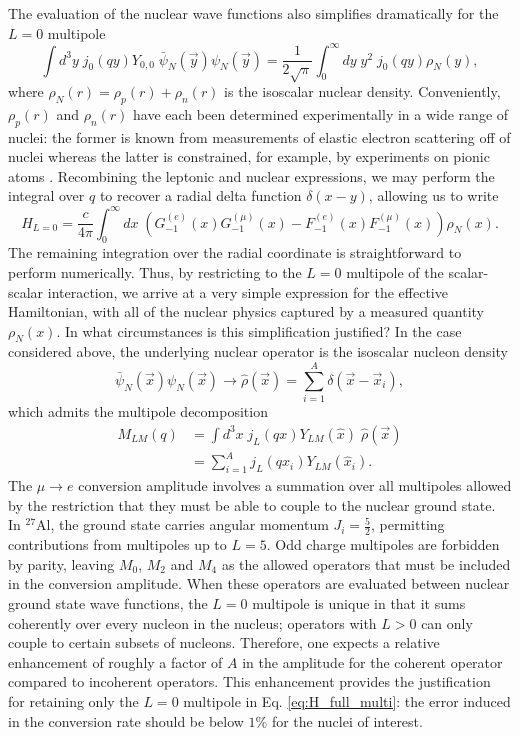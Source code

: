 \documentclass{book}[letterpaper,12pt]
\begin{document}
The evaluation of the nuclear wave functions also simplifies dramatically for the $L=0$ multipole
\begin{equation}
\int d^3y\;j_0(qy)Y_{0,0}\;\bar{\psi}_N(\vec{y})\psi_N(\vec{y})=\frac{1}{2\sqrt{\pi}}\int_0^{\infty}dy\;y^2\;j_0(qy)\rho_N(y),
\end{equation}
where $\rho_N(r)=\rho_p(r)+\rho_n(r)$ is the isoscalar nuclear density. Conveniently, $\rho_p(r)$ and $\rho_n(r)$ have each been determined experimentally in a wide range of nuclei: the former is known from measurements of elastic electron scattering off of nuclei \cite{DEVRIES1987495} whereas the latter is constrained, for example, by experiments on pionic atoms \cite{Garcia-Recio:1991ocp}. Recombining the leptonic and nuclear expressions, we may perform the integral over $q$ to recover a radial delta function $\delta(x-y)$, allowing us to write
\begin{equation}
H_{L=0}=\frac{c}{4\pi}\int_0^{\infty}dx\;\left(G_{-1}^{(e)}(x)G_{-1}^{(\mu)}(x)-F_{-1}^{(e)}(x)F_{-1}^{(\mu)}(x)\right)\rho_N(x).
\label{eq:H_coherent}
\end{equation}
The remaining integration over the radial coordinate is straightforward to perform numerically. Thus, by restricting to the $L=0$ multipole of the scalar-scalar interaction, we arrive at a very simple expression for the effective Hamiltonian, with all of the nuclear physics captured by a measured quantity $\rho_N(x)$. In what circumstances is this simplification justified? In the case considered above, the underlying nuclear operator is the isoscalar nucleon density
\begin{equation}
\bar{\psi}_N(\vec{x})\psi_N(\vec{x})\rightarrow\hat{\rho}(\vec{x})=\sum_{i=1}^A\delta(\vec{x}-\vec{x}_i),
\end{equation} 
which admits the multipole decomposition
\begin{equation}
\begin{split}
M_{LM}(q)&=\int d^3x\;j_L(qx)Y_{LM}(\hat{x})\;\hat{\rho}(\vec{x})\\
&=\sum_{i=1}^Aj_L(qx_i)Y_{LM}(\hat{x}_i).
\end{split}
\end{equation}
The $\mu\rightarrow e$ conversion amplitude involves a summation over all multipoles allowed by the restriction that they must be able to couple to the nuclear ground state. In $^{27}$Al, the ground state carries angular momentum $J_i=\frac{5}{2}$, permitting contributions from multipoles up to $L=5$. Odd charge multipoles are forbidden by parity, leaving $M_0$, $M_2$ and $M_4$ as the allowed operators that must be included in the conversion amplitude. When these operators are evaluated between nuclear ground state wave functions, the $L=0$ multipole is unique in that it sums coherently over every nucleon in the nucleus; operators with $L>0$ can only couple to certain subsets of nucleons. Therefore, one expects a relative enhancement of roughly a factor of $A$ in the amplitude for the coherent operator compared to incoherent operators. This enhancement provides the justification for retaining only the $L=0$ multipole in Eq. \ref{eq:H_full_multi}: the error induced in the conversion rate should be below $1\%$ for the nuclei of interest. 
\end{document}
